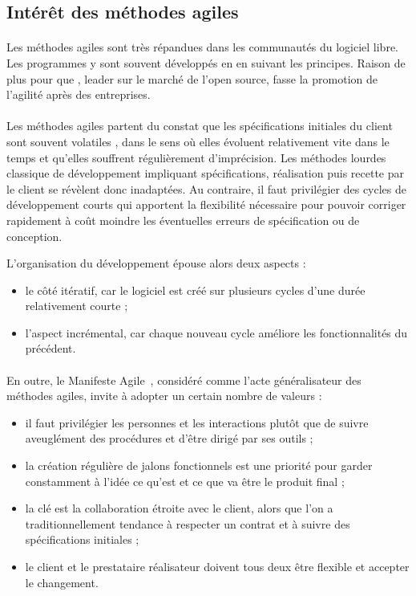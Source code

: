 \subsection{Intérêt des méthodes agiles}

\paragraph{}
Les méthodes agiles sont très répandues dans les communautés du logiciel libre.
Les programmes y sont souvent développés en en suivant les principes.
Raison de plus pour que \asmile{}, leader sur le marché de l'open source, fasse la promotion de l'agilité après des entreprises.


\paragraph{}
Les méthodes agiles partent du constat que les spécifications initiales du client sont souvent \og volatiles \fg, dans le sens où elles évoluent relativement vite dans le temps et qu'elles souffrent régulièrement d'imprécision.
Les méthodes lourdes classique de développement impliquant spécifications, réalisation puis recette par le client se révèlent donc inadaptées.
Au contraire, il faut privilégier des cycles de développement courts qui apportent la flexibilité nécessaire pour pouvoir corriger rapidement à coût moindre les éventuelles erreurs de spécification ou de conception.

L'organisation du développement épouse alors deux aspects :

\begin{itemize}
	\item le côté itératif, car le logiciel est créé sur plusieurs cycles d'une durée relativement courte ;
	\item l'aspect incrémental, car chaque nouveau cycle améliore les fonctionnalités du précédent.
\end{itemize}


\paragraph{}
En outre, le Manifeste Agile~\cite{agile}, considéré comme l'acte généralisateur des méthodes agiles, invite à adopter un certain nombre de valeurs :

\begin{itemize}
	\item il faut privilégier les personnes et les interactions plutôt que de suivre aveuglément des procédures et d'être dirigé par ses outils ;
	\item la création régulière de jalons fonctionnels est une priorité pour garder constamment à l'idée ce qu'est et ce que va être le produit final ;
	\item la clé est la collaboration étroite avec le client, alors que l'on a traditionnellement tendance à respecter un contrat et à suivre des spécifications initiales ;
	\item le client et le prestataire réalisateur doivent tous deux être flexible et accepter le changement.
\end{itemize}


